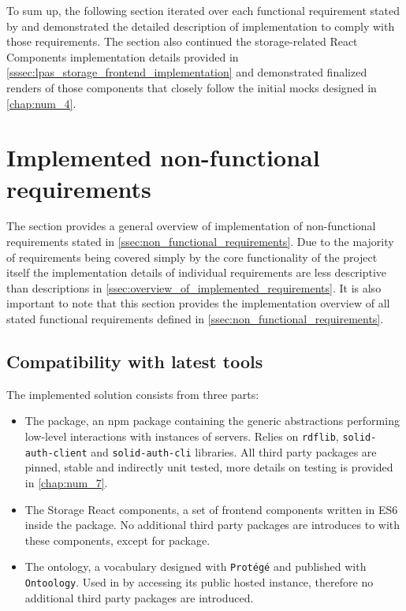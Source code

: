 To sum up, the following section iterated over each functional requirement stated by \lpa{} and demonstrated the detailed description of implementation to comply with those requirements. The section also continued the storage-related React Components implementation details provided in \autoref{sssec:lpas_storage_frontend_implementation} and demonstrated finalized renders of those components that closely follow the initial mocks designed in \autoref{chap:num_4}. 

\section{Implemented non-functional requirements}
\label{ssec:non_functional_requirements_implementation}

The section provides a general overview of implementation of non-functional requirements stated in \autoref{ssec:non_functional_requirements}. Due to the majority of requirements being covered simply by the core functionality of the \solid{} project itself the implementation details of individual requirements are less descriptive than descriptions in \autoref{ssec:overview_of_implemented_requirements}. It is also important to note that this section provides the implementation overview of all stated functional requirements defined in \autoref{ssec:non_functional_requirements}.

\subsection{Compatibility with latest tools}

The implemented solution consists from three parts:
\begin{itemize}
    \item The \lpas{} package, an npm package containing the generic abstractions performing low-level interactions with instances of \solid{} servers. Relies on \texttt{rdflib}, \texttt{solid-auth-client} and \texttt{solid-auth-cli} libraries. All third party packages are pinned, stable and indirectly unit tested, more details on testing is provided in \autoref{chap:num_7}. 
    \item The Storage React components, a set of frontend components written in ES6 inside the \lpa{} package. No additional third party packages are introduces to \lpa{} with these components, except for \lpas{} package. 
    \item The \lpas{} ontology, a vocabulary designed with \texttt{Protégé} and published with \texttt{Ontoology}. Used in \lpa{} by accessing its public hosted instance, therefore no additional third party packages are introduced.
\end{itemize}

